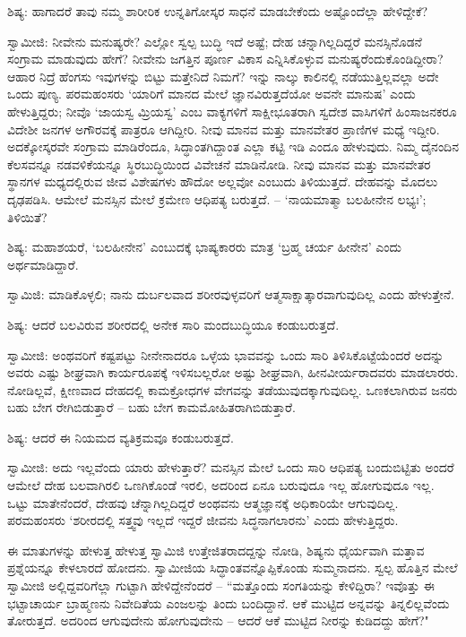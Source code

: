 ಶಿಷ್ಯ: ಹಾಗಾದರೆ ತಾವು ನಮ್ಮ ಶಾರೀರಿಕ ಉನ್ನತಿಗೋಸ್ಕರ ಸಾಧನೆ ಮಾಡಬೇಕೆಂದು ಅಷ್ಟೊಂದೆಲ್ಲಾ ಹೇಳಿದ್ದೇಕೆ?

ಸ್ವಾಮೀಜಿ: ನೀವೇನು ಮನುಷ್ಯರೇ? ಎಲ್ಲೋ ಸ್ವಲ್ಪ ಬುದ್ಧಿ ಇದೆ ಅಷ್ಟೆ; ದೇಹ ಚನ್ನಾಗಿಲ್ಲದಿದ್ದರೆ ಮನಸ್ಸಿನೊಡನೆ ಸಂಗ್ರಾಮ ಮಾಡುವುದು ಹೇಗೆ? ನೀವೇನು ಜಗತ್ತಿನ ಪೂರ್ಣ ವಿಕಾಸ ಎನ್ನಿಸಿಕೊಳ್ಳುವ ಮನುಷ್ಯರೆಂದುಕೊಂಡಿದ್ದೀರಾ? ಆಹಾರ ನಿದ್ರೆ ಹೆಂಗಸು ಇವುಗಳನ್ನು ಬಿಟ್ಟು ಮತ್ತೇನಿದೆ ನಿಮಗೆ? ಇನ್ನು ನಾಲ್ಕು ಕಾಲಿನಲ್ಲಿ ನಡೆಯುತ್ತಿಲ್ಲವಲ್ಲಾ ಅದೇ ಒಂದು ಪುಣ್ಯ. ಪರಮಹಂಸರು ‘ಯಾರಿಗೆ ಮಾನದ ಮೇಲೆ ಜ್ಞಾನವಿರುತ್ತದೆಯೋ ಅವನೇ ಮಾನುಷ’ ಎಂದು ಹೇಳುತ್ತಿದ್ದರು; ನೀವೊ ‘ಜಾಯಸ್ವ ಮ್ರಿಯಸ್ವ’ ಎಂಬ ವಾಕ್ಯಗಳಿಗೆ ಸಾಕ್ಷೀಭೂತರಾಗಿ ಸ್ವದೇಶ ವಾಸಿಗಳಿಗೆ ಹಿಂಸಾಜನಕರೂ ವಿದೇಶೀ ಜನಗಳ ಅಗೌರವಕ್ಕೆ ಪಾತ್ರರೂ ಆಗಿದ್ದೀರಿ. ನೀವು ಮಾನವ ಮತ್ತು ಮಾನವೇತರ ಪ್ರಾಣಿಗಳ ಮಧ್ಯೆ ಇದ್ದೀರಿ. ಅದಕ್ಕೋಸ್ಕರವೇ ಸಂಗ್ರಾಮ ಮಾಡಿರೆಂದೂ, ಸಿದ್ಧಾಂತಗಿದ್ದಾಂತ ಎಲ್ಲಾ ಕಟ್ಟಿ ಇಡಿ ಎಂದೂ ಹೇಳುವುದು. ನಿಮ್ಮ ದೈನಂದಿನ ಕೆಲಸವನ್ನೂ ನಡವಳಿಕೆಯನ್ನೂ ಸ್ಥಿರಬುದ್ಧಿಯಿಂದ ವಿವೇಚನೆ ಮಾಡಿನೋಡಿ. ನೀವು ಮಾನವ ಮತ್ತು ಮಾನವೇತರ ಸ್ಥಾನಗಳ ಮಧ್ಯದಲ್ಲಿರುವ ಜೀವ ವಿಶೇಷಗಳು ಹೌದೋ ಅಲ್ಲವೋ ಎಂಬುದು ತಿಳಿಯುತ್ತದೆ. ದೇಹವನ್ನು ಮೊದಲು ದೃಢಪಡಿಸಿ. ಆಮೇಲೆ ಮನಸ್ಸಿನ ಮೇಲೆ ಕ್ರಮೇಣ ಆಧಿಪತ್ಯ ಬರುತ್ತದೆ. – ‘ನಾಯಮಾತ್ಮಾ ಬಲಹೀನೇನ ಲಭ್ಯಃ’; ತಿಳಿಯಿತೆ?

ಶಿಷ್ಯ: ಮಹಾಶಯರೆ, ‘ಬಲಹೀನೇನ’ ಎಂಬುದಕ್ಕೆ ಭಾಷ್ಯಕಾರರು ಮಾತ್ರ ‘ಬ್ರಹ್ಮ ಚರ್ಯ ಹೀನೇನ’ ಎಂದು ಅರ್ಥಮಾಡಿದ್ದಾರೆ.

ಸ್ವಾಮಿಜಿ: ಮಾಡಿಕೊಳ್ಳಲಿ; ನಾನು ದುರ್ಬಲವಾದ ಶರೀರವುಳ್ಳವರಿಗೆ ಆತ್ಮಸಾಕ್ಷಾತ್ಕಾರವಾಗುವುದಿಲ್ಲ ಎಂದು ಹೇಳುತ್ತೇನೆ.

ಶಿಷ್ಯ: ಆದರೆ ಬಲವಿರುವ ಶರೀರದಲ್ಲಿ ಅನೇಕ ಸಾರಿ ಮಂದಬುದ್ಧಿಯೂ ಕಂಡುಬರುತ್ತದೆ.

ಸ್ವಾಮೀಜಿ: ಅಂಥವರಿಗೆ ಕಷ್ಟಪಟ್ಟು ನೀನೇನಾದರೂ ಒಳ್ಳೆಯ ಭಾವವನ್ನು ಒಂದು ಸಾರಿ ತಿಳಿಸಿಕೊಟ್ಟೆಯೆಂದರೆ ಅದನ್ನು ಅವರು ಎಷ್ಟು ಶೀಘ್ರವಾಗಿ ಕಾರ್ಯರೂಪಕ್ಕೆ ಇಳಿಸಬಲ್ಲರೋ ಅಷ್ಟು ಶೀಘ್ರವಾಗಿ, ಹೀನವೀರ್ಯರಾದವರು ಮಾಡಲಾರರು. ನೋಡಿಲ್ಲವೆ, ಕ್ಷೀಣವಾದ ದೇಹದಲ್ಲಿ ಕಾಮಕ್ರೋಧಗಳ ವೇಗವನ್ನು ತಡೆಯುವುದಕ್ಕಾಗುವುದಿಲ್ಲ. ಒಣಕಲಾಗಿರುವ ಜನರು ಬಹು ಬೇಗ ರೇಗಿಬಿಡುತ್ತಾರೆ – ಬಹು ಬೇಗ ಕಾಮಮೋಹಿತರಾಗಿಬಿಡುತ್ತಾರೆ.

ಶಿಷ್ಯ: ಆದರೆ ಈ ನಿಯಮದ ವ್ಯತಿಕ್ರಮವೂ ಕಂಡುಬರುತ್ತದೆ.

ಸ್ವಾಮೀಜಿ: ಅದು ಇಲ್ಲವೆಂದು ಯಾರು ಹೇಳುತ್ತಾರೆ? ಮನಸ್ಸಿನ ಮೇಲೆ ಒಂದು ಸಾರಿ ಆಧಿಪತ್ಯ ಬಂದುಬಿಟ್ಟಿತು ಅಂದರೆ ಆಮೇಲೆ ದೇಹ ಬಲವಾಗಿರಲಿ ಒಣಗಿಕೊಂಡೆ ಇರಲಿ, ಅದರಿಂದ ಏನೂ ಬರುವುದೂ ಇಲ್ಲ ಹೋಗುವುದೂ ಇಲ್ಲ. ಒಟ್ಟು ಮಾತೇನೆಂದರೆ, ದೇಹವು ಚೆನ್ನಾಗಿಲ್ಲದಿದ್ದರೆ ಅಂಥವನು ಆತ್ಮಜ್ಞಾನಕ್ಕೆ ಅಧಿಕಾರಿಯೇ ಆಗುವುದಿಲ್ಲ. ಪರಮಹಂಸರು ‘ಶರೀರದಲ್ಲಿ ಸತ್ತ್ವವು ಇಲ್ಲದೆ ಇದ್ದರೆ ಜೀವನು ಸಿದ್ಧನಾಗಲಾರನು’ ಎಂದು ಹೇಳುತ್ತಿದ್ದರು.

ಈ ಮಾತುಗಳನ್ನು ಹೇಳುತ್ತ ಹೇಳುತ್ತ ಸ್ವಾಮಿಜಿ ಉತ್ತೇಜಿತರಾದದ್ದನ್ನು ನೋಡಿ, ಶಿಷ್ಯನು ಧೈರ್ಯವಾಗಿ ಮತ್ತಾವ ಪ್ರಶ್ನೆಯನ್ನೂ ಕೇಳಲಾರದೆ ಹೋದನು. ಸ್ವಾಮೀಜಿಯ ಸಿದ್ಧಾಂತವನ್ನೊಪ್ಪಿಕೊಂಡು ಸುಮ್ಮನಾದನು. ಸ್ವಲ್ಪ ಹೊತ್ತಿನ ಮೇಲೆ ಸ್ವಾಮೀಜಿ ಅಲ್ಲಿದ್ದವರಿಗೆಲ್ಲಾ ಗುಟ್ಟಾಗಿ ಹೇಳಿದ್ದೇನೆಂದರೆ – “ಮತ್ತೊಂದು ಸಂಗತಿಯನ್ನು ಕೇಳಿದ್ದಿರಾ? ಇವೊತ್ತು ಈ ಭಟ್ಟಾಚಾರ್ಯ ಬ್ರಾಹ್ಮಣನು ನಿವೇದಿತೆಯ ಎಂಜಲನ್ನು ತಿಂದು ಬಂದಿದ್ದಾನೆ. ಆಕೆ ಮುಟ್ಟಿದ ಅನ್ನವನ್ನು ತಿನ್ನಲಿಲ್ಲವೆಂದು ತೋರುತ್ತದೆ. ಅದರಿಂದ ಆಗುವುದೇನು ಹೋಗುವುದೇನು – ಆದರೆ ಆಕೆ ಮುಟ್ಟಿದ ನೀರನ್ನು ಕುಡಿದದ್ದು ಹೇಗೆ?"

